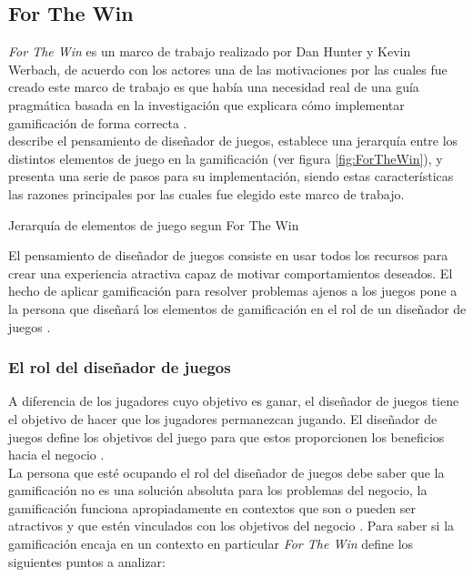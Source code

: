 \subsection{For The Win} \label{sec:ForTheWin}

 {\em For The Win} es un marco de trabajo realizado por Dan Hunter y Kevin Werbach, de acuerdo
 con los actores una de las motivaciones por las cuales fue creado este marco de trabajo es que
 había una necesidad real de una guía pragmática basada en la investigación que explicara cómo
 implementar gamificación de forma correcta \cite{ForTheWin}.\\

  describe el pensamiento de diseñador de juegos, establece una
 jerarquía entre los distintos elementos de juego en la gamificación (ver figura \ref{fig:ForTheWin}),
 y presenta una serie de pasos para su implementación, siendo estas características las razones
 principales por las cuales fue elegido este marco de trabajo.

        {Jerarquía de elementos de juego segun For The Win}

 \noindent El pensamiento de diseñador de juegos consiste en usar todos los recursos para
 crear una experiencia atractiva capaz de motivar comportamientos deseados. El hecho de
 aplicar gamificación para resolver problemas ajenos a los juegos pone a la persona que
 diseñará los elementos de gamificación en el rol de un diseñador de juegos \cite[p. 29]{ForTheWin}.


\subsubsection{El rol del diseñador de juegos}

 \noindent A diferencia de los jugadores cuyo objetivo es ganar, el diseñador de juegos
 tiene el objetivo de hacer que los jugadores permanezcan jugando. El diseñador de juegos
 define los objetivos del juego para que estos proporcionen los beneficios hacia el negocio
 \cite[p. 29]{ForTheWin}.\\

 \noindent La persona que esté ocupando el rol del diseñador de juegos debe saber que la
 gamificación no es una solución absoluta para los problemas del negocio, la gamificación
 funciona apropiadamente en contextos que son o pueden ser atractivos y que estén vinculados
 con los objetivos del negocio \cite[p. 30]{ForTheWin}. Para saber si la gamificación encaja
 en un contexto en particular {\em For The Win} define los siguientes puntos a analizar:

